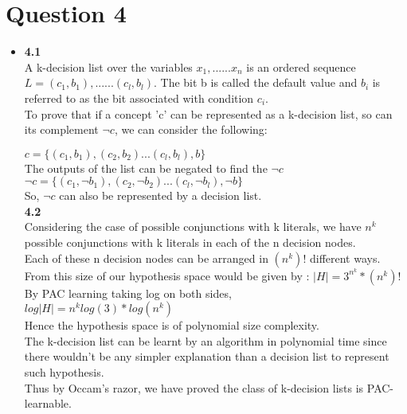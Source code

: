 \documentclass[11pt]{article}
\begin{document}
\section{Question 4}

\begin{itemize}
\item[]
\textbf{4.1}\\

A k-decision list over the variables $x_1, ......x_n$ is an ordered sequence $ L= (c_1,b_1),......(c_l,b_l)$. The bit b is called the default value and $b_i$ is referred to as the bit associated with condition $c_i$.\\

To prove that if a concept 'c' can be represented as a k-decision list, so can its complement $\neg c$, we can consider the following:


$c=\{(c_1,b_1),(c_2,b_2)...(c_l,b_l),b\}$\\

The outputs of the list can be negated to find the $\neg{}c$\\

$\neg{}c=\{(c_1,\neg{}b_1),(c_2,\neg{}b_2)...(c_l,\neg{}b_l),\neg{}b\}$\\
So, $\neg{}c$  can also be represented by a decision list.\\

\textbf{4.2}\\

Considering the case of  possible conjunctions with k literals, we have 
$n^k$ possible conjunctions with k literals in each of the n decision nodes.\\
Each of these n decision nodes can be arranged in $(n^k)!$ different ways.\\

From this size of our hypothesis space would be given by :
$|H|=3^{n^k}*(n^k)!$\\
By PAC learning taking log on both sides,\\
$log|H|=n^k log(3) *log(n^k)$\\
Hence the hypothesis space is of polynomial size complexity.\\
The k-decision list can be learnt by an algorithm in polynomial time since there wouldn't be any simpler explanation than a decision list to represent such hypothesis.\\


Thus by Occam's razor, we have proved the class of k-decision lists is  PAC- learnable.\\



\end{itemize}
\end{document}
